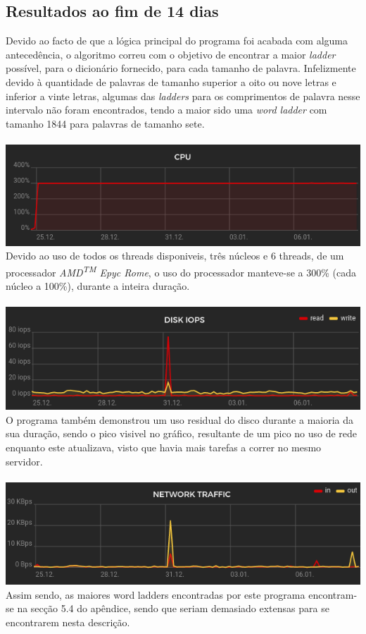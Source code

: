 \documentclass[a4paper,11pt]{article}
\begin{document}
	\subsection{Resultados ao fim de 14 dias}
	Devido ao facto de que a lógica principal do programa foi acabada com alguma antecedência, o algoritmo correu com o objetivo de encontrar a maior \emph{ladder} possível, para o dicionário fornecido, para cada tamanho de palavra.
	Infelizmente devido à quantidade de palavras de tamanho superior a oito ou nove letras e inferior a vinte letras, algumas das \emph{ladders} para os comprimentos de palavra nesse intervalo não foram encontrados, tendo a maior sido uma \emph{word ladder} com tamanho 1844 para palavras de tamanho sete.\\ \\
	 \includegraphics[width=\textwidth]{cpu}\label{fig:figure}\\
	Devido ao uso de todos os threads disponiveis, três núcleos e 6 threads, de um processador \emph{AMD\textsuperscript{TM} Epyc Rome}, o uso do processador manteve-se a 300\% (cada núcleo a 100\%), durante a inteira duração.\\ \\
	\includegraphics[width=\textwidth]{iops}\label{fig:figure}\\
	O programa também demonstrou um uso residual do disco durante a maioria da sua duração, sendo o pico visivel no gráfico, resultante de um pico no uso de rede enquanto este atualizava, visto que havia mais tarefas a correr no mesmo servidor.\\ \\     
	\includegraphics[width=\textwidth]{net}\label{fig:figure}\\    
	Assim sendo, as maiores word ladders encontradas por este programa encontram-se na secção 5.4 do apêndice, sendo que seriam demasiado extensas para se encontrarem nesta descrição.
    \clearpage
\end{document}
